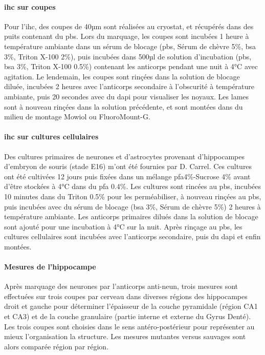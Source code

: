 \paragraph{\Acrlong{ihc} sur coupes}	
\label{par:ihccoupe}
	Pour l'\Gls{ihc}, des coupes de 40µm sont réalisées au cryostat, et récupérés dans des puits contenant du \acrshort{pbs}. Lors du marquage, les coupes sont incubées 1 heure à température ambiante dans un sérum de blocage (\acrshort{pbs}, Sérum de chèvre 5\%, \acrshort{bsa} 3\%, Triton X-100 2\%), puis  incubées dans 500µl de solution d'incubation (\acrshort{pbs}, \acrshort{bsa} 3\%, Triton X-100 0.5\%) contenant les anticorps pendant une nuit à 4°C avec agitation. Le lendemain, les coupes sont rinçées dans la solution de blocage diluée, incubées 2 heures avec l'anticorps secondaire à l'obscurité à température ambiante, puis 20 secondes avec du \gls{dapi} pour visualiser les noyaux. Les lames sont à nouveau rinçées dans la solution précédente, et sont montées dans du milieu de montage Mowiol ou FluoroMount-G\textregistered.
	
\paragraph{\Acrlong{ihc} sur cultures cellulaires}
\label{par:ihcculture}
	Des cultures primaires de neurones et d'astrocytes provenant d'hippocampes d'embryon de  souris (stade E16) m'ont été fournies par D. Carrel. Ces cultures ont été cultivées 12 jours puis fixées dans un mélange \gls{pfa}4\%-Sucrose 4\% avant d'être stockées à 4°C dans du \gls{pfa} 0.4\%. Les cultures sont rincées au \acrshort{pbs}, incubées 10 minutes dans du Triton 0.5\% pour les perméabiliser, à nouveau rinçées au \acrshort{pbs}, puis incubées avec du sérum de blocage (\acrshort{bsa} 3\%, Sérum de chèvre 5\%) 2 heures à température ambiante. Les anticorps primaires dilués dans la solution de blocage sont ajouté pour une incubation à 4°C sur la nuit.  Après rinçage au \acrshort{pbs}, les cultures cellulaires sont incubées avec l'anticorps secondaire, puis du \acrshort{dapi} et enfin montées.
	
\paragraph{Mesures de l'hippocampe}
\label{par:hippNeuN}
	Après marquage des neurones par l'anticorps anti-\acrshort{neun}, trois mesures sont effectuées sur trois coupes par cerveau dans diverses régions des hippocampes droit et gauche pour déterminer l'épaisseur de la couche pyramidale (région CA1 et CA3) et de la couche granulaire (partie interne et externe du Gyrus Denté). Les trois coupes sont choisies dans le sens antéro-postérieur pour représenter au mieux l'organisation la structure. Les mesures mutantes versus sauvages sont alors comparée région par région.
	
